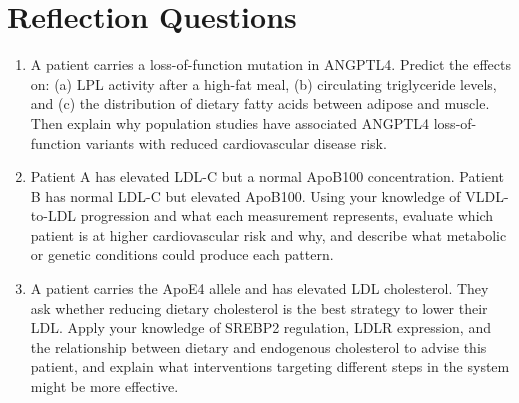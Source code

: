 \documentclass{tufte-handout}
\begin{document}
\section{Reflection Questions}
\begin{enumerate}
\item A patient carries a loss-of-function mutation in ANGPTL4. Predict the effects on: (a) LPL activity after a high-fat meal, (b) circulating triglyceride levels, and (c) the distribution of dietary fatty acids between adipose and muscle. Then explain why population studies have associated ANGPTL4 loss-of-function variants with reduced cardiovascular disease risk.
\item Patient A has elevated LDL-C but a normal ApoB100 concentration. Patient B has normal LDL-C but elevated ApoB100. Using your knowledge of VLDL-to-LDL progression and what each measurement represents, evaluate which patient is at higher cardiovascular risk and why, and describe what metabolic or genetic conditions could produce each pattern.
\item A patient carries the ApoE4 allele and has elevated LDL cholesterol. They ask whether reducing dietary cholesterol is the best strategy to lower their LDL. Apply your knowledge of SREBP2 regulation, LDLR expression, and the relationship between dietary and endogenous cholesterol to advise this patient, and explain what interventions targeting different steps in the system might be more effective.
\end{enumerate}
\end{document}
